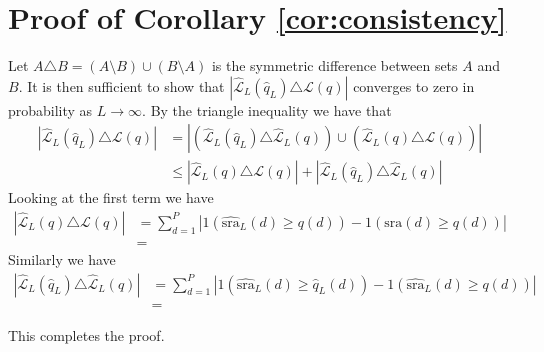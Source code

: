 \documentclass[12pt,a4paper]{article}
\newcommand{\nn}{\nonumber}
\theoremstyle{plain}
\begin{document}
\section{Proof of Corollary \ref{cor:consistency}}
Let $A \triangle B = (A \setminus B) \cup (B \setminus A)$ is the symmetric difference between sets $A$ and $B$. It is then sufficient to show that
$|\widehat{\mathcal{L}}_L(\widehat{q}_L) \triangle \mathcal{L}(q)|$ converges to zero in probability as $L \rightarrow \infty$. By the triangle inequality
we have that
\begin{align}
 \left|\widehat{\mathcal{L}}_L(\widehat{q}_L) \triangle \mathcal{L}(q)\right| &= \left|\left(\widehat{\mathcal{L}}_L(\widehat{q}_L) \triangle \widehat{\mathcal{L}}_L(q)\right) \cup \left(\widehat{\mathcal{L}}_L(q) \triangle \mathcal{L}(q)\right)\right|\label{eq:corSetDiff}\\
   &\leq \left|\widehat{\mathcal{L}}_L(q) \triangle \mathcal{L}(q)\right| + \left|\widehat{\mathcal{L}}_L(\widehat{q}_L) \triangle \widehat{\mathcal{L}}_L(q)\right|\nn
\end{align}
Looking at the first term we have
\begin{align}
  \left|\widehat{\mathcal{L}}_L(q) \triangle \mathcal{L}(q)\right| &= \sum_{d=1}^P \left|1\left(\widehat{\textrm{sra}}_L(d) \geq q(d)\right)  - 1\left(\textrm{sra}(d)  \geq q(d)\right)\right|\\
   &=
\end{align}
Similarly we have
\begin{align}
\left|\widehat{\mathcal{L}}_L(\widehat{q}_L) \triangle \widehat{\mathcal{L}}_L(q)\right| &= \sum_{d=1}^P \left|1\left(\widehat{\textrm{sra}}_L(d) \geq \widehat{q}_L(d)\right) - 1\left(\widehat{\textrm{sra}}_L(d) \geq q(d)\right)\right|\\
   &=
\end{align}


This completes the proof.
\end{document}
